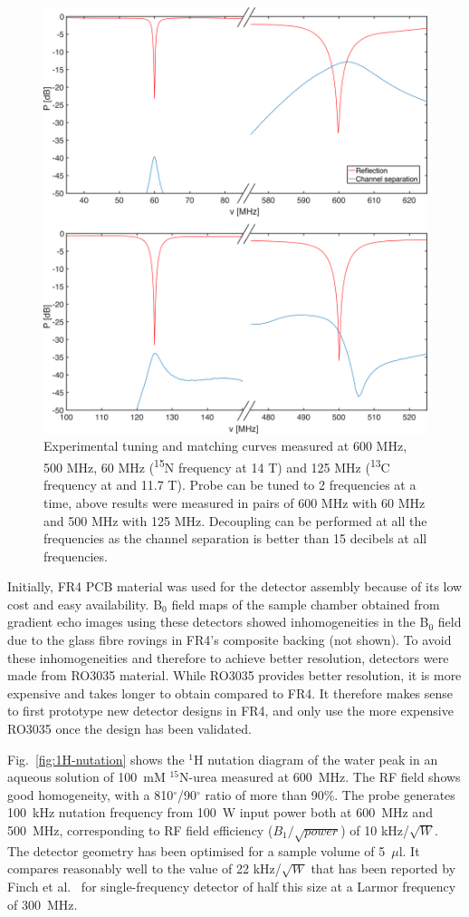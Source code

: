 \documentclass[preprint,5p]{elsarticle}
\newcommand{\fig}[1]{Fig.~\ref{#1}}
\begin{document}
\begin{figure}
\centering
\includegraphics[width=.7\linewidth,keepaspectratio=true]{./figures/ms5n17-tlp-im-180710-tandm-sameaxis.png} 
\caption{
Experimental tuning and matching curves measured at 600 MHz, 500 MHz, 
60 MHz (\textsuperscript{15}N frequency at 14 T) and 125 MHz (\textsuperscript{13}C frequency at  and 11.7 T). 
Probe can be tuned to 2 frequencies at a time, above results were measured in 
pairs of 600 MHz with 60 MHz and 500 MHz with 125 MHz. Decoupling can be performed at all the 
frequencies as the channel separation is better than 15 decibels at all frequencies.}
\label{fig:tandm} 
\end{figure}

Initially, FR4 PCB material was used for the detector assembly because of its low cost and easy availability. 
B$_0$ field maps of the sample chamber obtained from gradient echo images using these detectors 
showed inhomogeneities in the B$_0$ field due to the glass fibre rovings in FR4's composite backing (not shown).
To avoid these inhomogeneities and therefore to achieve better resolution, 
detectors were made from RO3035 material. While RO3035 provides better resolution, it is more expensive 
and takes longer to obtain compared to FR4. 
It therefore makes sense to first prototype new detector designs in FR4, and only use the more expensive RO3035 
once the design has been validated.

\fig{fig:1H-nutation} shows the $^1$H nutation diagram of the water peak in an aqueous solution of 
100~mM $^{15}$N-urea  measured at 600~MHz. The RF field shows good homogeneity, with a 810$^{\circ}$/90$^{\circ}$ 
ratio of more than 90\%. The probe generates 100~kHz nutation frequency from 100~W input power both at 
600~MHz and 500~MHz, corresponding to RF field efficiency ($B_{1}/\sqrt{power}$) of 10 kHz/$\sqrt{W}$. 
The detector geometry has been optimised for a sample volume of 5~$\mu$l. It compares reasonably well to
the value of 22 kHz/$\sqrt{W}$ that has been reported by Finch et al.~\cite{gream_2016} for single-frequency detector 
of half this size at a Larmor frequency of 300~MHz. 
\end{document}

